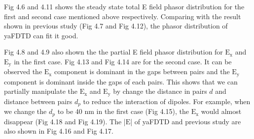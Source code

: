 Fig 4.6 and 4.11 shows the steady state total E field phasor distribution for the first and second case mentioned above
respectively. Comparing with the result shown in previous study (Fig 4.7 and Fig 4.12), the phasor distribution of
yaFDTD can fit it good. 

Fig 4.8 and 4.9 also shown the the partial E field phasor distribution for $\mathrm{E_x}$ and $\mathrm{E_y}$ in the
first case. Fig 4.13 and Fig 4.14 are for the second case. It can be observed the $\mathrm{E_x}$ component is dominant
in the gaps between pairs and the $\mathrm{E_y}$ component is dominant inside the gaps of each pairs. This shows that we
can partially manipulate the $\mathrm{E_x}$ and $\mathrm{E_y}$ by change the distance in pairs $d$ and distance between
pairs $d_p$ to reduce the interaction of dipoles.  For example, when we change the $d_p$ to be 40 nm in the first case
(Fig 4.15), the $\mathrm{E_x}$ would almost disappear (Fig 4.18 and Fig 4.19). The |$\mathrm{E}$| of yaFDTD and previous
study are also shown in Fig 4.16 and Fig 4.17.
